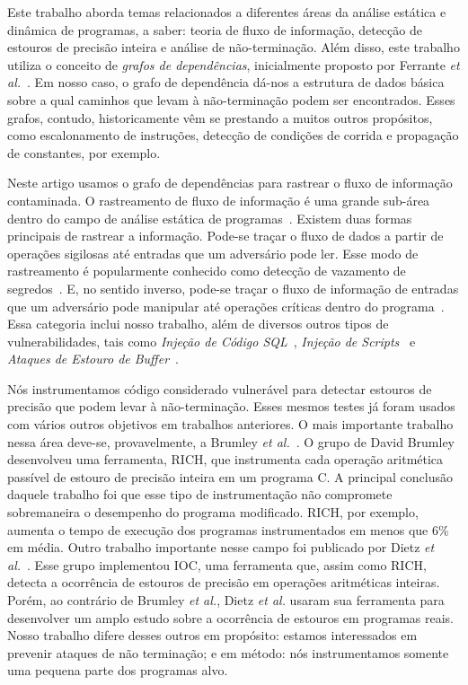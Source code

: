 \documentclass{llncs}
\begin{document}
Este trabalho aborda temas relacionados a diferentes áreas da análise estática
e dinâmica de programas, a saber: teoria de fluxo de informação, detecção de
estouros de precisão inteira e análise de não-terminação.
Além disso, este trabalho utiliza o conceito de {\em grafos de dependências},
inicialmente proposto por Ferrante {\em et al.}~\cite{Ferrante87}.
Em nosso caso, o grafo de dependência dá-nos a estrutura de dados básica sobre
a qual caminhos que levam à não-terminação podem ser encontrados.
Esses grafos, contudo, historicamente vêm se prestando a muitos outros
propósitos, como escalonamento de instruções, detecção de condições de corrida e
propagação de constantes, por exemplo.

Neste artigo usamos o grafo de dependências para rastrear o fluxo de
informação contaminada.
O rastreamento de fluxo de informação é uma grande sub-área dentro do campo de
análise estática de programas~\cite{Denning77}.
Existem duas formas principais de rastrear a informação.
Pode-se traçar o fluxo de dados a partir de operações sigilosas até entradas
que um adversário pode ler.
Esse modo de rastreamento é popularmente conhecido como detecção de vazamento
de segredos~\cite{Hammer06}.
E, no sentido inverso, pode-se traçar o fluxo de informação de entradas que
um adversário pode manipular até operações críticas dentro do
programa~\cite{Tripp09}.
Essa categoria inclui nosso trabalho, além de diversos outros tipos de
vulnerabilidades, tais como {\em Injeção de Código SQL}~\cite{Wassermann07},
{\em Injeção de Scripts}~\cite{Rimsa10} e {\em Ataques de Estouro de
Buffer}~\cite{Levy96}.

Nós instrumentamos código considerado vulnerável para detectar estouros de
precisão que podem levar à não-terminação.
Esses mesmos testes já foram usados com vários outros objetivos em trabalhos
anteriores.
O mais importante trabalho nessa área deve-se, provavelmente, a Brumley
{\em et al.}~\cite{Brumley07}.
O grupo de David Brumley desenvolveu uma ferramenta, RICH, que instrumenta
cada operação aritmética passível de estouro de precisão inteira em um programa
C.
A principal conclusão daquele trabalho foi que esse tipo de instrumentação
não compromete sobremaneira o desempenho do programa modificado.
RICH, por exemplo, aumenta o tempo de execução dos programas instrumentados
em menos que 6\% em média.
Outro trabalho importante nesse campo foi publicado por Dietz
{\em et al.}~\cite{Dietz12}.
Esse grupo implementou IOC, uma ferramenta que, assim como RICH, detecta a
ocorrência de estouros de precisão em operações aritméticas inteiras.
Porém, ao contrário de Brumley {\em et al.}, Dietz {\em et al.} usaram sua
ferramenta para desenvolver um amplo estudo sobre a ocorrência de estouros
em programas reais.
Nosso trabalho difere desses outros em propósito: estamos interessados em
prevenir ataques de não terminação; e em método: nós instrumentamos somente uma
pequena parte dos programas alvo.
\end{document}
